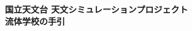 
\setcounter{page}{1}

\newpage

\thispagestyle{empty}
\begin{center}
  \vspace*{1cm}
  { {\Large \bf 国立天文台 天文シミュレーションプロジェクト} \\
      \vspace{5cm}
  {\Huge \bf 流体学校の手引} }


  \vfill

  


\end{center}





